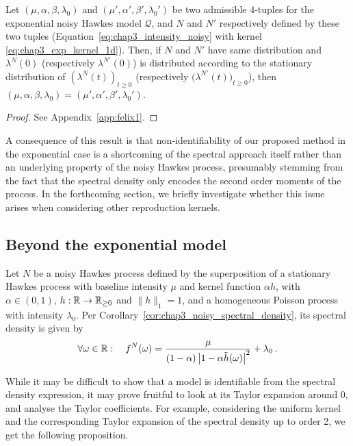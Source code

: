 \begin{proposition}\label{prop:chap3_statN_identifiability}
	Let $(\mu, \alpha, \beta, \lambda_0)$ and $(\mu', \alpha', \beta', \lambda_0')$ be two admissible $4$-tuples for the exponential noisy Hawkes model $\mathcal Q$,
	and $N$ and $N'$ respectively defined by these two tuples (Equation~\eqref{eq:chap3_intensity_noisy} with kernel \eqref{eq:chap3_exp_kernel_1d}).
	Then,
	if $N$ and $N'$ have same distribution
	and $\lambda^N(0)$ (respectively $\lambda^{N'}(0)$) is distributed according to the stationary distribution of $\left( \lambda^N(t) \right)_{t \ge 0}$ (respectively $\bigl( \lambda^{N'}(t) \bigr)_{t \ge 0}$),
	then $(\mu, \alpha, \beta, \lambda_0) = (\mu', \alpha', \beta', \lambda_0')$.
\end{proposition} 
\begin{proof}
  See Appendix~\ref{app:felix1}.
\end{proof}

A consequence of this result is that non-identifiability of our proposed method in the exponential case is a shortcoming of the spectral approach itself rather than an underlying property of the noisy Hawkes process, presumably stemming from the fact that the spectral density only encodes the second order moments of the process.
In the forthcoming section, we briefly investigate whether this issue arises when considering other reproduction kernels.
                
        
      \subsection{Beyond the exponential model}
        Let $N$ be a noisy Hawkes process defined by the superposition of a stationary 	Hawkes process with baseline intensity $\mu$ and kernel function $\alpha h$, with $\alpha \in (0,1)$, $h : {\mathbb R} \to {\mathbb R}_{\ge 0}$ and $\|h\|_1 = 1$, and a homogeneous Poisson process with intensity $\lambda_0$.
Per Corollary~\ref{cor:chap3_noisy_spectral_density}, its spectral density is given by
\begin{equation*}
  \forall \omega \in {\mathbb R}: \quad
	f^N(\omega) = \frac{\mu}{(1 - \alpha) \left \lvert 1 - \alpha \tilde h(\omega) \right \rvert^2} + \lambda_0 \,.
\end{equation*}

While it may be difficult to show that a model is identifiable from the spectral density expression, it may prove fruitful to look at its Taylor expansion around 0, and analyse the Taylor coefficients. 
For example, considering the uniform kernel and the corresponding Taylor expansion of the spectral density up to order 2, we get the following proposition.

